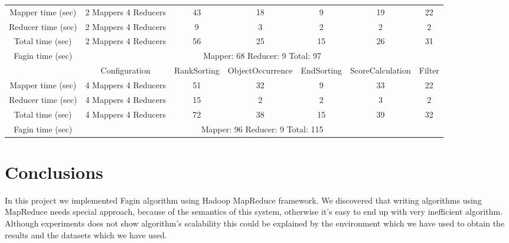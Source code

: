 \documentclass[a4paper]{article}
\begin{document}
\begin{table}[htbp]
{\begin{tabular}{|c|c|c|c|c|c|c|}
            \hline
            Mapper time (sec) & 2 Mappers 4 Reducers & 43 & 18 & 9 & 19 & 22  \\
            Reducer time (sec) & 2 Mappers 4 Reducers & 9 & 3 & 2 & 2 & 2   \\
            Total time (sec) & 2 Mappers 4 Reducers & 56 & 25 & 15 & 26 & 31 \\
            \hline
            Fagin time (sec) & \multicolumn{6}{|c|}{Mapper: 68 Reducer: 9 Total: 97}  \\
            \hline
            \hline
             & Configuration & RankSorting & ObjectOccurrence & EndSorting & ScoreCalculation & Filter  \\
            \hline
            Mapper time (sec) & 4 Mappers 4 Reducers & 51 & 32 & 9 & 33 & 22  \\
            Reducer time (sec) & 4 Mappers 4 Reducers & 15 & 2 & 2 & 3 & 2   \\
            Total time (sec) & 4 Mappers 4 Reducers & 72 & 38 & 15 & 39 & 32 \\
            \hline
            Fagin time (sec) & \multicolumn{6}{|c|}{Mapper: 96 Reducer: 9 Total: 115}  \\
            \hline
        \end{tabular}
    }
\end{table}

\section{Conclusions}

In this project we implemented Fagin algorithm using Hadoop MapReduce framework.
We discovered that writing algorithms using MapReduce needs special approach, because of the semantics of this system, otherwise it's easy to end up with very inefficient algorithm.
Although experiments does not show algorithm's scalability this could be explained by the environment which we have used to obtain the results and the datasets which we have used.
\end{document}

